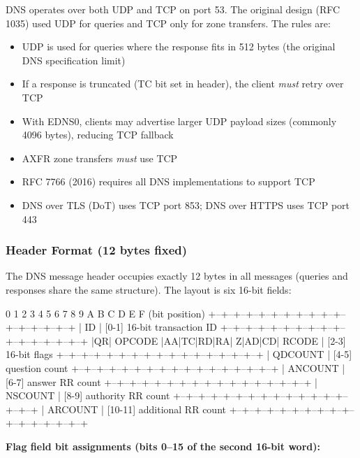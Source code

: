 \documentclass[11pt,letterpaper]{article}
\begin{document}
DNS operates over both UDP and TCP on port 53. The original design (RFC 1035) used UDP for queries and TCP only for zone transfers. The rules are:

\begin{itemize}
  \item UDP is used for queries where the response fits in 512 bytes (the original DNS specification limit)
  \item If a response is truncated (TC bit set in header), the client \emph{must} retry over TCP
  \item With EDNS0, clients may advertise larger UDP payload sizes (commonly 4096 bytes), reducing TCP fallback
  \item AXFR zone transfers \emph{must} use TCP
  \item RFC 7766 (2016) requires all DNS implementations to support TCP
  \item DNS over TLS (DoT) uses TCP port 853; DNS over HTTPS uses TCP port 443
\end{itemize}

\subsubsection{Header Format (12 bytes fixed)}

The DNS message header occupies exactly 12 bytes in all messages (queries and responses share the same structure). The layout is six 16-bit fields:

\begin{asciibox}
 0  1  2  3  4  5  6  7  8  9  A  B  C  D  E  F   (bit position)
+--+--+--+--+--+--+--+--+--+--+--+--+--+--+--+--+
|                      ID                         |  [0-1]  16-bit transaction ID
+--+--+--+--+--+--+--+--+--+--+--+--+--+--+--+--+
|QR|  OPCODE   |AA|TC|RD|RA| Z|AD|CD|   RCODE    |  [2-3]  16-bit flags
+--+--+--+--+--+--+--+--+--+--+--+--+--+--+--+--+
|                    QDCOUNT                      |  [4-5]  question count
+--+--+--+--+--+--+--+--+--+--+--+--+--+--+--+--+
|                    ANCOUNT                      |  [6-7]  answer RR count
+--+--+--+--+--+--+--+--+--+--+--+--+--+--+--+--+
|                    NSCOUNT                      |  [8-9]  authority RR count
+--+--+--+--+--+--+--+--+--+--+--+--+--+--+--+--+
|                    ARCOUNT                      | [10-11] additional RR count
+--+--+--+--+--+--+--+--+--+--+--+--+--+--+--+--+
\end{asciibox}

\textbf{Flag field bit assignments (bits 0--15 of the second 16-bit word):}
\end{document}
